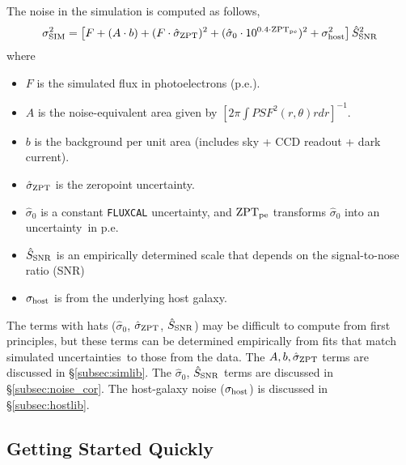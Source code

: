 \documentclass[12pt]{article}
\newcommand{\unc}{uncertainty}
\newcommand{\uncs}{uncertainties}
\newcommand{\sigSIM}{\sigma_{\rm SIM}}
\newcommand{\sigZPT}{\hat\sigma_{\rm ZPT}}
\newcommand{\sigOFF}{\hat\sigma_0}
\newcommand{\sigHOST}{\sigma_{\rm host}}
\newcommand{\SSNR}{\hat{S}_{\rm SNR}}
\newcommand{\ZPTpe}{{\rm ZPT}_{\rm pe}}
\begin{document}
{The noise in the simulation is computed as follows,
\begin{equation}
  \sigSIM^2 = \left[ F + (A\cdot b) 
                 + (F\cdot\sigZPT)^2 
                 + (\sigOFF \cdot 10^{0.4\cdot\ZPTpe})^2
                 + \sigHOST^2
           \right]{\SSNR}^2
  \label{eq:noiseModel}
\end{equation}
%  
where 
\begin{itemize}
  \item $F$ is the simulated flux in photoelectrons (p.e.).
  \item $A$ is the noise-equivalent area given by 
        $[2\pi\int PSF^2(r,\theta) r dr]^{-1}$.
  \item  $b$ is the background per unit area 
         (includes sky + CCD readout + dark current).
  \item $\sigZPT$ is the zeropoint \unc.
  \item $\sigOFF$ is a constant {\tt FLUXCAL} \unc, and
    $\ZPTpe$ transforms $\sigOFF$ into an \unc\ in p.e.
  \item $\SSNR$ is an empirically determined scale that depends 
           on the signal-to-nose  ratio (SNR)
  \item $\sigHOST$ is from the underlying host galaxy.
\end{itemize}
%
The terms with hats ($\sigOFF$, $\sigZPT$, $\SSNR$)
may be difficult to compute from first principles,
but these terms can be determined empirically from 
fits that match simulated \uncs\ to those from the data.
The $A,b,\sigZPT$ terms are discussed in 
\S\ref{subsec:simlib}.
The $\sigOFF$, $\SSNR$ terms are discussed in 
\S\ref{subsec:noise_cor}.
The host-galaxy noise ($\sigHOST$) is discussed in
\S\ref{subsec:hostlib}.

   \subsection{Getting Started Quickly }
   \label{subsec:sim_start}

}
\end{document}
